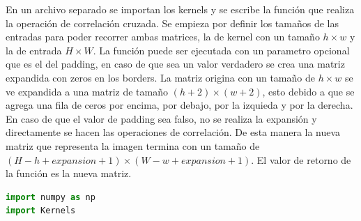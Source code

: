 \documentclass{article}
\begin{document}
En un archivo separado se importan los kernels y se escribe la función que realiza la operación de correlación cruzada. Se empieza por definir los tamaños de las entradas
para poder recorrer ambas matrices, la de kernel con un tamaño $h\times$$w$ y la de entrada $H\times$$W$. La función puede ser ejecutada con un parametro opcional que es el del padding, en caso de que sea un valor verdadero 
se crea una matriz expandida con zeros en los borders. La matriz origina con un tamaño de $h\times$$w$ se ve expandida a una matriz de tamaño $(h+2)\times$$(w+2)$, esto debido a que se agrega una fila de ceros por encima, 
por debajo, por la izquieda y por la derecha. En caso de que el valor de padding sea falso, no se realiza la expansión y directamente se hacen las operaciones de correlación. De esta manera la nueva matriz que representa la imagen 
termina con un tamaño de $(H-h+expansion+1)\times$$(W-w+expansion+1)$. El valor de retorno de la función es la nueva matriz.  \\
\begin{lstlisting}[language=python]
import numpy as np 
import Kernels


\end{lstlisting}$$
\end{document}
